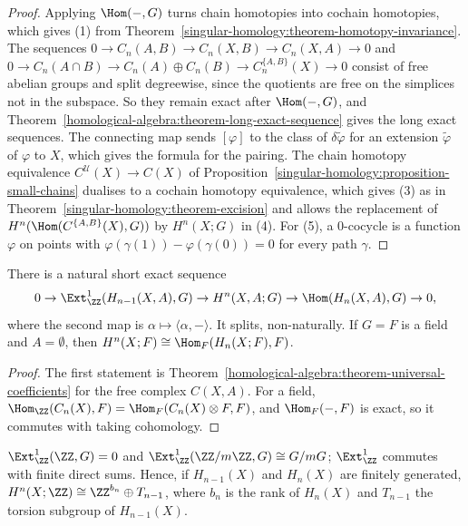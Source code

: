 \begin{proof}
Applying $\Hom(-, G)$ turns chain homotopies into cochain homotopies, which gives (1) from Theorem~\ref{singular-homology:theorem-homotopy-invariance}. The
sequences $0 \to C_n(A, B) \to C_n(X, B) \to C_n(X, A) \to 0$ and $0 \to C_n(A \cap B) \to C_n(A) \oplus C_n(B) \to C^{\{A, B\}}_n(X) \to 0$ consist of free abelian groups
and split degreewise, since the quotients are free on the simplices not in the subspace. So they remain exact after $\Hom(-, G)$, and
Theorem~\ref{homological-algebra:theorem-long-exact-sequence} gives the long exact sequences. The connecting map sends $[\varphi]$ to the class of $\delta\tilde\varphi$ for
an extension $\tilde\varphi$ of $\varphi$ to $X$, which gives the formula for the pairing. The chain homotopy equivalence $C^{\mathcal{U}}(X) \to C(X)$ of
Proposition~\ref{singular-homology:proposition-small-chains} dualises to a cochain homotopy equivalence, which gives (3) as in
Theorem~\ref{singular-homology:theorem-excision} and allows the replacement of $H^n(\Hom(C^{\{A,B\}}(X), G))$ by $H^n(X; G)$ in (4). For (5), a $0$-cocycle is a function
$\varphi$ on points with $\varphi(\gamma(1)) - \varphi(\gamma(0)) = 0$ for every path $\gamma$.
\end{proof}

\begin{theorem}\label{singular-homology:theorem-universal-coefficients}
There is a natural short exact sequence
\[
0 \to \Ext^1_\ZZ(H_{n-1}(X, A), G) \to H^n(X, A; G) \to \Hom(H_n(X, A), G) \to 0,
\]
where the second map is $\alpha \mapsto \langle \alpha, - \rangle$. It splits, non-naturally. If $G = F$ is a field and $A = \emptyset$, then
$H^n(X; F) \cong \Hom_F(H_n(X; F), F)$.
\end{theorem}

\begin{proof}
The first statement is Theorem~\ref{homological-algebra:theorem-universal-coefficients} for the free complex $C(X, A)$. For a field,
$\Hom_\ZZ(C_n(X), F) = \Hom_F(C_n(X) \otimes F, F)$, and $\Hom_F(-, F)$ is exact, so it commutes with taking cohomology.
\end{proof}

\begin{lemma}\label{singular-homology:lemma-ext-z}
$\Ext^1_\ZZ(\ZZ, G) = 0$ and $\Ext^1_\ZZ(\ZZ/m\ZZ, G) \cong G/mG$; $\Ext^1_\ZZ$ commutes with finite direct sums. Hence, if $H_{n-1}(X)$ and $H_n(X)$ are finitely generated,
$H^n(X; \ZZ) \cong \ZZ^{b_n} \oplus T_{n-1}$, where $b_n$ is the rank of $H_n(X)$ and $T_{n-1}$ the torsion subgroup of $H_{n-1}(X)$.
\end{lemma}


